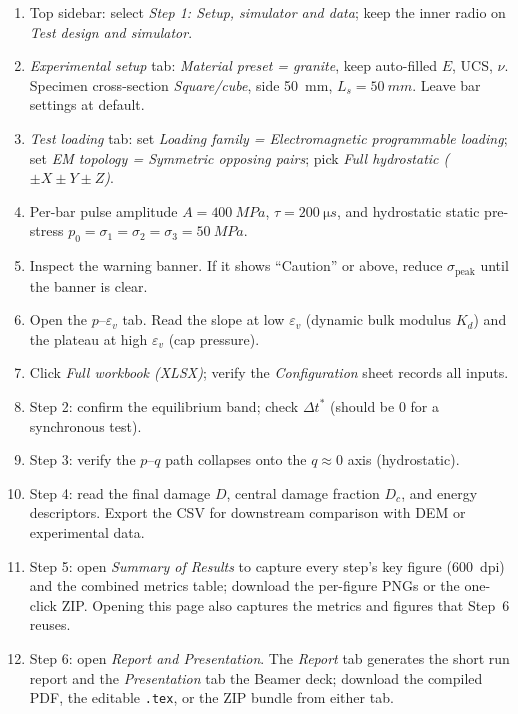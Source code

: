 \documentclass[11pt,a4paper,openany]{book}
\providecommand{\SI}[2]{\qty{#1}{#2}}
\theoremstyle{handbook}
\newcommand{\sig}{\sigma}
\newcommand{\eps}{\varepsilon}
\newcommand{\Ls}{L_s}
\newcommand{\sigpeak}{\sig_{\text{peak}}}
\begin{document}
\begin{stepbox}
\begin{enumerate}[leftmargin=*,itemsep=3pt]
  \item Top sidebar: select \emph{Step 1: Setup, simulator and data}; keep
        the inner radio on \emph{Test design and simulator}.
  \item \emph{Experimental setup} tab: \emph{Material preset = granite},
        keep auto-filled $E$, UCS, $\nu$. Specimen cross-section
        \emph{Square/cube}, side \SI{50}{mm}, $\Ls=\SI{50}{mm}$. Leave bar
        settings at default.
  \item \emph{Test loading} tab: set \emph{Loading family =
        Electromagnetic programmable loading}; set \emph{EM topology =
        Symmetric opposing pairs}; pick \emph{Full hydrostatic
        ($\pm X\pm Y\pm Z$)}.
  \item Per-bar pulse amplitude $A=\SI{400}{MPa}$,
        $\tau=\SI{200}{\micro s}$, and hydrostatic static pre-stress
        $p_0=\sig_1=\sig_2=\sig_3=\SI{50}{MPa}$.
  \item Inspect the warning banner. If it shows ``Caution'' or above,
        reduce $\sigpeak$ until the banner is clear.
  \item Open the $p$--$\eps_v$ tab. Read the slope at low $\eps_v$ (dynamic
        bulk modulus $K_d$) and the plateau at high $\eps_v$ (cap
        pressure).
  \item Click \emph{Full workbook (XLSX)}; verify the
        \emph{Configuration} sheet records all inputs.
  \item Step 2: confirm the equilibrium band; check $\Delta t^{\ast}$
        (should be 0 for a synchronous test).
  \item Step 3: verify the $p$--$q$ path collapses onto the $q\approx 0$
        axis (hydrostatic).
  \item Step 4: read the final damage $D$, central damage fraction $D_c$,
        and energy descriptors. Export the CSV for downstream comparison
        with DEM or experimental data.
  \item Step 5: open \emph{Summary of Results} to capture every step's key
        figure (\SI{600}{dpi}) and the combined metrics table; download the
        per-figure PNGs or the one-click ZIP. Opening this page also captures
        the metrics and figures that Step~6 reuses.
  \item Step 6: open \emph{Report and Presentation}. The \emph{Report} tab
        generates the short run report and the \emph{Presentation} tab the
        Beamer deck; download the compiled PDF, the editable \texttt{.tex}, or
        the ZIP bundle from either tab.
\end{enumerate}
\end{stepbox}
\end{document}
